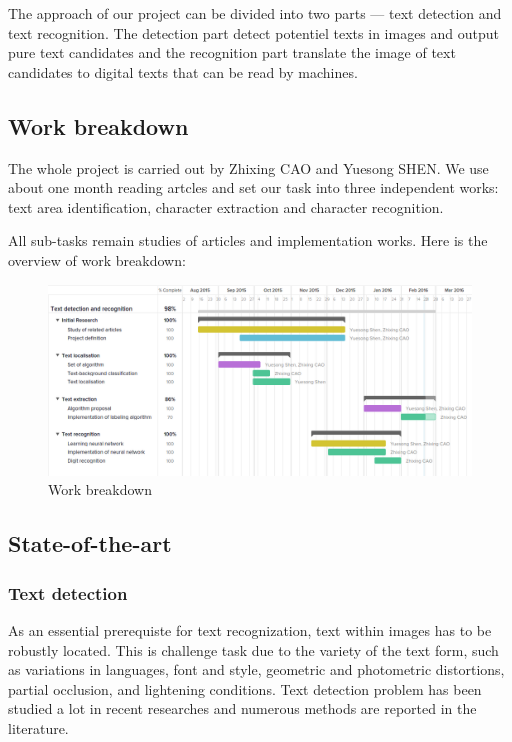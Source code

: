 \documentclass[paper=a4, french, 11pt]{scrartcl}
\begin{document}
The approach of our project can be divided into two parts --- text detection and text recognition. The detection part detect potentiel texts in images and output pure text candidates and the recognition part translate the image of text candidates to digital texts that can be read by machines.

\subsection{Work breakdown} \mbox{} \vspace{-0.5cm}

The whole project is carried out by Zhixing CAO and Yuesong SHEN. We use about one month reading artcles and set our task into three independent works: text area identification, character extraction and character recognition.

All sub-tasks remain studies of articles and implementation works. Here is the overview of work breakdown:

\begin{figure}[h]
\begin{center}
   \includegraphics[width=0.95\linewidth]{breakdowns.png}
\end{center}
\caption{Work breakdown}
\label{fig:heatmap}
\end{figure}

\subsection{State-of-the-art} \mbox{} \vspace{-0.5cm}

\subsubsection{Text detection} \mbox{} \vspace{-0.5cm}

As an essential prerequiste for text recognization, text within images has to be robustly located. This is challenge task due to the variety of the text form, such as variations in languages, font and style, geometric and photometric distortions, partial occlusion, and lightening conditions. Text detection problem has been studied a lot in recent researches and numerous methods are reported in the literature.
\end{document}
